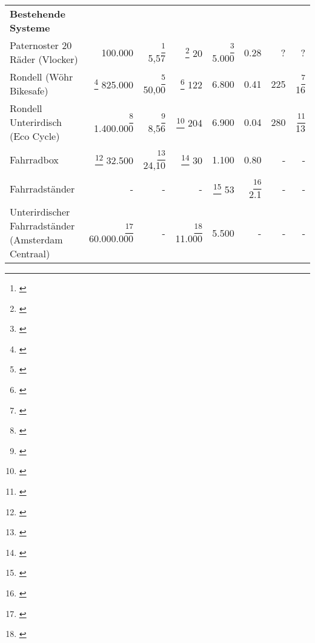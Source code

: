 \begin{landscape}
\begin{table}
\begin{tabular}{p{}rrrrrrr}
            \textbf{Bestehende Systeme}                                                                                                                                                                                                                                                                                                                                                                                 \\
            Paternoster 20 Räder (Vlocker)                     & 100.000                                               & \footnote{\cite{vlocker_fläche,parkplatz_größe}} 5,57 & \footnote{\cite{vlocker_kapazität}} 20          & \footnote{\cite{vlocker_preis}} 5.000 & 0.28                                       & ?                                                & ?                                            \\
            Rondell (Wöhr Bikesafe)                            & \footnote{\cite{richtpreisangebot}} 825.000           & \footnote{\cite{wöhr_fläche}} 50,00                   & \footnote{\cite{richtpreisangebot}} 122         & 6.800                                 & 0.41                                       & 225                                              & \footnote{\cite{wöhr_time}} 16               \\
            Rondell Unterirdisch (Eco Cycle)                   & \footnote{\cite{ecocycle_cost}} 1.400.000             & \footnote{\cite{ecocycle_giken}} 8,56                 & \footnote{\cite{ecocycle_giken}} 204            & 6.900                                 & 0.04                                       & 280                                              & \footnote{\cite{ecocycle_specifications}} 13 \\
            Fahrradbox                                         & \footnote{\cite{box_angebot_orion}} 32.500            & \footnote{\cite{box_angebot_orion}} 24,10             & \footnote{\cite{box_angebot_orion}} 30          & 1.100                                 & 0.80                                       & -                                                & -                                            \\
            Fahrradständer                                     & -                                                     & -                                                     & -                                               & \footnote{\cite{ständer_preis}} 53    & \footnote{\cite{leitfaden_vorarlberg}} 2.1 & -                                                & -                                            \\
            Unterirdischer Fahrradständer (Amsterdam Centraal) & \footnote{\cite{ständer_unter}} 60.000.000            & -                                                     & \footnote{\cite{ständer_unter}} 11.000          & 5.500                                 & -                                          & -                                                & -                                            \\


\end{tabular}
\end{table}
\end{landscape}

